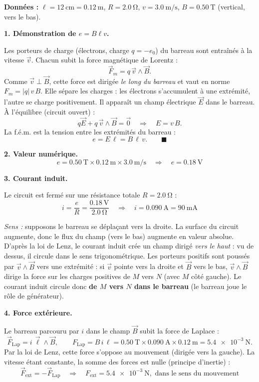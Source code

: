 \documentclass[11pt]{article}
\begin{document}
\begin{corrige}
\textbf{Données :} $\ell = \SI{12}{\centi\meter} = \SI{0,12}{\meter}$, $R = \SI{2,0}{\ohm}$, $v = \SI{3,0}{\meter\per\second}$, $B = \SI{0,50}{\tesla}$ (vertical, vers le bas).

\textbf{1. Démonstration de $e = B\ell v$.}

Les porteurs de charge (électrons, charge $q = -e_0$) du barreau sont entraînés à la vitesse $\vec{v}$. Chacun subit la force magnétique de Lorentz :
\[
\vec{F}_m = q\,\vec{v}\wedge\vec{B}.
\]
Comme $\vec{v}\perp\vec{B}$, cette force est dirigée \emph{le long du barreau} et vaut en norme $F_m = |q|\,v\,B$. Elle sépare les charges : les électrons s'accumulent à une extrémité, l'autre se charge positivement. Il apparaît un champ électrique $\vec{E}$ dans le barreau. À l'équilibre (circuit ouvert) :
\[
q\vec{E} + q\,\vec{v}\wedge\vec{B} = \vec{0} \quad\Rightarrow\quad E = v\,B.
\]
La f.é.m. est la tension entre les extrémités du barreau :
\[
e = E\,\ell = B\,\ell\,v. \qquad \blacksquare
\]

\textbf{2. Valeur numérique.}
\[
e = \SI{0,50}{\tesla} \times \SI{0,12}{\meter} \times \SI{3,0}{\meter\per\second} \quad\Rightarrow\quad \boxed{e = \SI{0,18}{\volt}}
\]

\textbf{3. Courant induit.}

Le circuit est fermé sur une résistance totale $R = \SI{2,0}{\ohm}$ :
\[
i = \dfrac{e}{R} = \dfrac{\SI{0,18}{\volt}}{\SI{2,0}{\ohm}} \quad\Rightarrow\quad \boxed{i = \SI{0,090}{\ampere} = \SI{90}{\milli\ampere}}
\]

\emph{Sens :} supposons le barreau se déplaçant vers la droite. La surface du circuit augmente, donc le flux du champ (vers le bas) augmente en valeur absolue. D'après la loi de Lenz, le courant induit crée un champ dirigé \emph{vers le haut} : vu de dessus, il circule dans le sens trigonométrique. Les porteurs positifs sont poussés par $\vec{v}\wedge\vec{B}$ vers une extrémité : si $\vec{v}$ pointe vers la droite et $\vec{B}$ vers le bas, $\vec{v}\wedge\vec{B}$ dirige la force sur les charges positives de $M$ vers $N$ (avec $M$ côté gauche). Le courant induit circule donc \textbf{de $M$ vers $N$ dans le barreau} (le barreau joue le rôle de générateur).

\textbf{4. Force extérieure.}

Le barreau parcouru par $i$ dans le champ $\vec{B}$ subit la force de Laplace :
\[
\vec{F}_{\text{Lap}} = i\,\vec{\ell}\wedge\vec{B}, \qquad F_{\text{Lap}} = B\,i\,\ell = \SI{0,50}{\tesla} \times \SI{0,090}{\ampere} \times \SI{0,12}{\meter} = \SI{5,4e-3}{\newton}.
\]
Par la loi de Lenz, cette force s'oppose au mouvement (dirigée vers la gauche). La vitesse étant constante, la somme des forces est nulle (principe d'inertie) :
\[
\vec{F}_{\text{ext}} = -\vec{F}_{\text{Lap}} \quad\Rightarrow\quad \boxed{F_{\text{ext}} = \SI{5,4e-3}{\newton}, \text{ dans le sens du mouvement}}
\]


\end{corrige}
\end{document}
